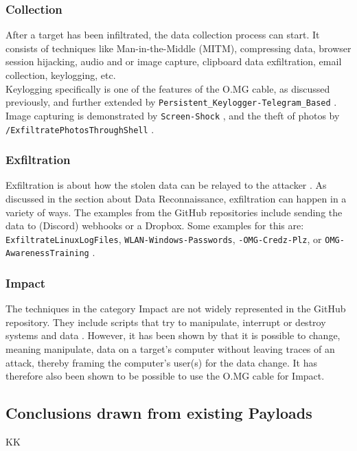 \subsubsection{Collection}
After a target has been infiltrated, the data collection process can start. It consists of techniques like Man-in-the-Middle (MITM), compressing data, browser session hijacking, audio and or image capture, clipboard data exfiltration, email collection, keylogging, etc. \cite{MITREATTCK} \\
Keylogging specifically is one of the features of the O.MG cable, as discussed previously, and further extended by \verb|Persistent_Keylogger-Telegram_Based|
\cite{OmgpayloadsPayloadsLibrary}. Image capturing is demonstrated by \verb|Screen-Shock| \cite{OmgpayloadsPayloadsLibrary}, and the theft of photos by \verb|/ExfiltratePhotosThroughShell| \cite{OmgpayloadsPayloadsLibrary}.


\subsubsection{Exfiltration}

Exfiltration is about how the stolen data can be relayed to the attacker \cite{MITREATTCK}. As discussed in the section about Data Reconnaissance,
exfiltration can happen in a variety of ways. The examples from the GitHub repositories include sending the data to (Discord) webhooks or a
Dropbox. Some examples for this are:  \verb|ExfiltrateLinuxLogFiles|, \verb|WLAN-Windows-Passwords|, \verb|-OMG-Credz-Plz|, or \verb|OMG-AwarenessTraining|  \cite{OmgpayloadsPayloadsLibrary}.

\subsubsection{Impact}

The techniques in the category Impact are not widely represented in the GitHub repository. They include scripts that try to manipulate, interrupt or destroy systems and data \cite{MITREATTCK}.
However, it has been shown by \cite{lawalFacilitatingCyberenabledFraud2022} that it is possible to change, meaning manipulate, data on a target's
computer without leaving traces of an attack, thereby framing the computer's user(s) for the data change. It has therefore also been shown to be possible to use the O.MG cable for Impact.

\subsection{Conclusions drawn from existing Payloads}KK

